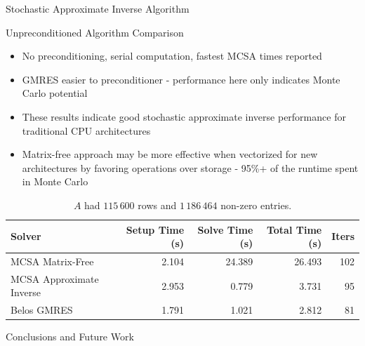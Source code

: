 \documentclass{beamer}
\begin{document}
\begin{frame}{Stochastic Approximate Inverse Algorithm}
\end{frame}

\begin{frame}{Unpreconditioned Algorithm Comparison}

  \begin{itemize}
    \small
  \item No preconditioning, serial computation, fastest MCSA times reported
  \item GMRES easier to preconditioner - performance here only indicates Monte
    Carlo potential
  \item These results indicate good stochastic approximate inverse performance
    for traditional CPU architectures
  \item Matrix-free approach may be more effective when vectorized for new
    architectures by favoring operations over storage - 95\%+ of the runtime
    spent in Monte Carlo
  \end{itemize}

  \begin{table}[htb!]
    \tiny
    \begin{center}
      \begin{tabular}{lrrrr}
        \toprule
        \multicolumn{1}{l}{Solver} &
        \multicolumn{1}{r}{Setup Time (s)} &
        \multicolumn{1}{r}{Solve Time (s)} &
        \multicolumn{1}{r}{Total Time (s)} &
        \multicolumn{1}{r}{Iters}
        \\ \midrule
        MCSA Matrix-Free & 2.104 & 24.389 & 26.493 & 102 \\
        MCSA Approximate Inverse & 2.953 & 0.779 & 3.731 & 95 \\
        Belos GMRES & 1.791 & 1.021 & 2.812 & 81\\
        \bottomrule 
      \end{tabular}
    \end{center}
    \caption{$A$ had $115\,600$ rows and $1\,186\,464$ non-zero entries.}
  \end{table} 

\end{frame}

\begin{frame}

  \center Conclusions and Future Work
  
\end{frame}
\end{document}
